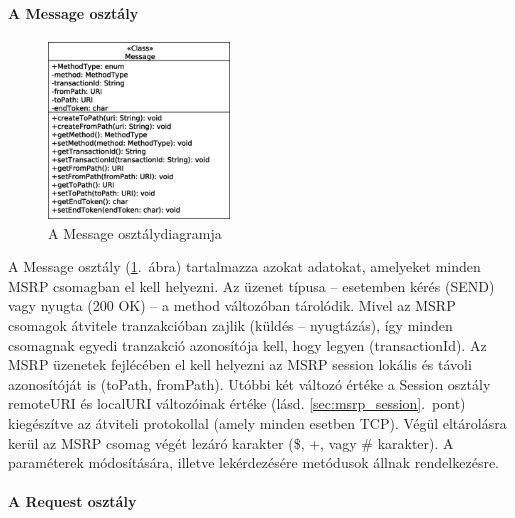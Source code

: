 \paragraph{A Message osztály\\}
\label{sec:msrp_message}

\begin{figure}
  \vspace{-15pt}
  \begin{center}
    \includegraphics[width=0.43\textwidth]{img/class_diagrams/Message.eps}
  \end{center}
  \vspace{-15pt}
  \captionsetup{font=scriptsize}
  \caption{A Message osztálydiagramja}
   \label{fig:class_message}
  \vspace{-10pt}
\end{figure}
A Message osztály (\ref{fig:class_message}.~ábra) tartalmazza azokat adatokat, amelyeket minden MSRP csomagban el kell helyezni. Az üzenet típusa -- esetemben kérés (SEND) vagy nyugta (200 OK) -- a method változóban tárolódik. Mivel az MSRP csomagok átvitele tranzakcióban zajlik (küldés -- nyugtázás), így minden csomagnak egyedi tranzakció azonosítója kell, hogy legyen (transactionId). Az MSRP üzenetek fejlécében el kell helyezni az MSRP session lokális és távoli azonosítóját is (toPath, fromPath). Utóbbi két változó értéke a Session osztály remoteURI és localURI változóinak értéke (lásd. \ref{sec:msrp_session}.~pont) kiegészítve az átviteli protokollal (amely minden esetben TCP). Végül eltárolásra kerül az MSRP csomag végét lezáró karakter (\$, +, vagy  \# karakter). A paraméterek módosítására, illetve lekérdezésére metódusok állnak rendelkezésre.

\paragraph{A Request osztály\\}
\label{sec:msrp_request}

